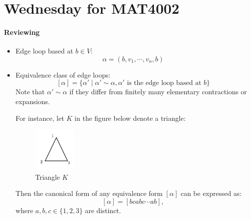 \section{Wednesday for MAT4002}
\paragraph{Reviewing}
\begin{itemize}
\item
Edge loop based at $b\in V$:
\[
\alpha = (b,v_1,\cdots ,v_n,b)
\]
\item
Equivalence class of edge loops:
\[
[\alpha] = \{
\alpha'\mid\alpha' \sim\alpha,\text{$\alpha'$ is the edge loop based at $b$}
\}
\]
Note that $\alpha'\sim\alpha$ if they differ from finitely many elementary contractions or expansions.

For instance, let $K$ in the figure below denote a triangle:
\begin{figure}[H]
\centering
\includegraphics[width=0.2\textwidth]{week12/f_12_7}
\caption{Triangle $K$}
\label{fig:12:1}
\end{figure}
Then the canonical form of any equivalence form $[\alpha]$ can be expressed as:
\[
[\alpha] = [bcabc\cdots ab],
\]
where $a,b,c\in\{1,2,3\}$ are distinct.
\end{itemize}

